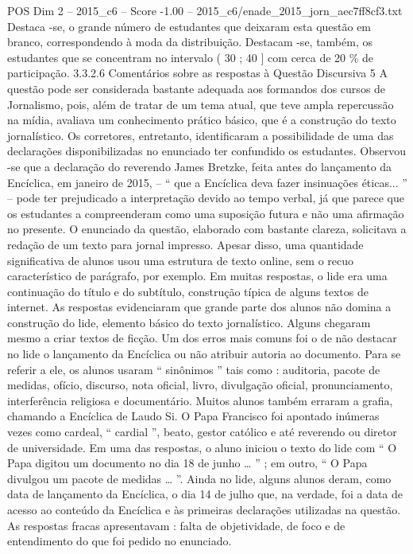 \begin{textsample}{POS Dim 2 – 2015\_c6 – Score -1.00 – 2015\_c6/enade\_2015\_jorn\_aec7ff8cf3.txt}
Destaca -se, o grande número de estudantes que deixaram esta questão em branco, correspondendo à moda da distribuição.
Destacam -se, também, os estudantes que se concentram no intervalo ( 30 ; 40 ] com cerca de 20 \% de participação. 3.3.2.6 Comentários sobre as respostas à Questão Discursiva 5 A questão pode ser considerada bastante adequada aos formandos dos cursos de Jornalismo, pois, além de tratar de um tema atual, que teve ampla repercussão na mídia, avaliava um conhecimento prático básico, que é a construção do texto jornalístico.
Os corretores, entretanto, identificaram a possibilidade de uma das declarações disponibilizadas no enunciado ter confundido os estudantes.
Observou -se que a declaração do reverendo James Bretzke, feita antes do lançamento da Encíclica, em janeiro de 2015, – “ que a Encíclica deva fazer insinuações éticas... ” – pode ter prejudicado a interpretação devido ao tempo verbal, já que parece que os estudantes a compreenderam como uma suposição futura e não uma afirmação no presente.
O enunciado da questão, elaborado com bastante clareza, solicitava a redação de um texto para jornal impresso.
Apesar disso, uma quantidade significativa de alunos usou uma estrutura de texto online, sem o recuo característico de parágrafo, por exemplo.
Em muitas respostas, o lide era uma continuação do título e do subtítulo, construção típica de alguns textos de internet.
As respostas evidenciaram que grande parte dos alunos não domina a construção do lide, elemento básico do texto jornalístico.
Alguns chegaram mesmo a criar textos de ficção.
Um dos erros mais comuns foi o de não destacar no lide o lançamento da Encíclica ou não atribuir autoria ao documento.
Para se referir a ele, os alunos usaram “ sinônimos ” tais como : auditoria, pacote de medidas, ofício, discurso, nota oficial, livro, divulgação oficial, pronunciamento, interferência religiosa e documentário.
Muitos alunos também erraram a grafia, chamando a Encíclica de Laudo Si.
O Papa Francisco foi apontado inúmeras vezes como cardeal, “ cardial ”, beato, gestor católico e até reverendo ou diretor de universidade.
Em uma das respostas, o aluno iniciou o texto do lide com “ O Papa digitou um documento no dia 18 de junho … ” ; em outro, “ O Papa divulgou um pacote de medidas … ”.
Ainda no lide, alguns alunos deram, como data de lançamento da Encíclica, o dia 14 de julho que, na verdade, foi a data de acesso ao conteúdo da Encíclica e às primeiras declarações utilizadas na questão.
As respostas fracas apresentavam : falta de objetividade, de foco e de entendimento do que foi pedido no enunciado.

\end{textsample}
